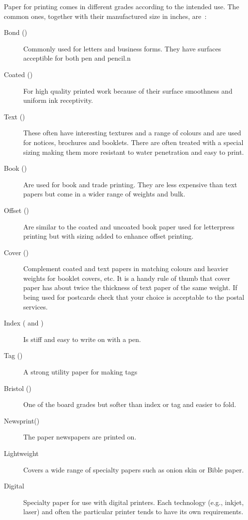 \documentclass[10pt,letterpaper,extrafontsizes]{memoir}
\begin{document}
    Paper for printing comes in different grades according to the intended 
use. The common ones, together with their manufactured size in inches, 
are~\autocite{POCKETPAL}:
\begin{description}
\item[Bond ()] Commonly used for letters and
business forms. They have surfaces acceptible for both pen and pencil.n

\item[Coated ()] For high quality printed
work because of their surface smoothness and uniform ink receptivity.

\item[Text ()] These often have interesting 
textures and a range of colours and are used for notices, brochures and 
booklets. There are often treated with a special sizing making them more
resistant to water penetration and easy to print.

\item[Book ()] Are used for book and trade 
printing. They are less expensive than text papers but come in a wider range
of weights and bulk.

\item[Offset ()] Are similar to the coated and
uncoated book paper used for letterpress printing but with sizing added to
enhance offset printing.

\item[Cover ()] Complement coated and text
papers in matching colours and heavier weights for booklet covers, etc. It is
a handy rule of thumb that cover paper has about twice the thickness of text
paper of the same weight. If being used for postcards check that your choice 
is acceptable to the postal services.

\item[Index ( and )] Is 
stiff and easy to write on with a pen.

\item[Tag  ()] A strong utility paper for making
tags

\item[Bristol ()] One of the board grades
but softer than index or tag and easier to fold.

\item[Newsprint()] The paper newspapers 
are printed on.

\item[Lightweight] Covers a wide range of
specialty papers such as onion skin or Bible paper.

\item[Digital] Specialty paper for use with
digital printers. Each technology (e.g., inkjet, laser) and often 
the particular printer tends to have its own requirements.

\end{description}
\end{document}
